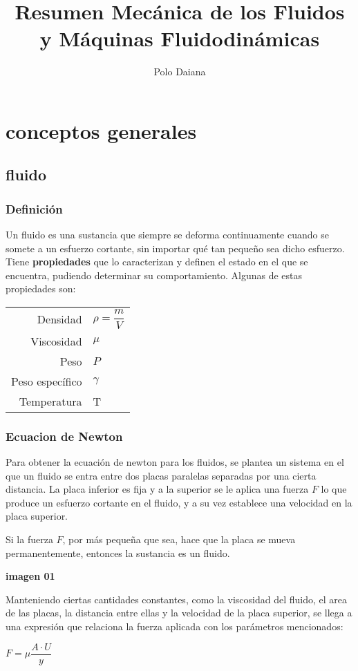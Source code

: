 \documentclass[11pt,a4paper]{article}
\title{Resumen Mecánica de los Fluidos y  Máquinas Fluidodinámicas}
\author{Polo Daiana}
\begin{document}
	\section{conceptos generales}
	\subsection{fluido}
	\subsubsection{Definición}
	Un fluido es una sustancia que siempre se deforma continuamente cuando se somete a un esfuerzo cortante, sin importar qué tan pequeño sea dicho esfuerzo.\\
	
	Tiene \textbf{propiedades} que lo caracterizan y definen el estado en el que se encuentra, pudiendo determinar su comportamiento. Algunas de estas propiedades son: \\
	\begin{center}
		\begin{tabular} {r l}
			Densidad & $\rho = \dfrac{m}{V}$\\
			Viscosidad & $\mu$\\
			Peso & $P$\\
			Peso específico & $\gamma$ \\
			Temperatura & T \\
		\end{tabular}
	\end{center}
	
	
	\subsubsection{Ecuacion de Newton}
	Para obtener la ecuación de newton para los fluidos, se plantea un sistema en el que un fluido se entra entre dos placas paralelas separadas por una cierta distancia. La placa inferior es fija y a la superior se le aplica una fuerza $F$ lo que produce un esfuerzo cortante en el fluido, y a su vez establece una velocidad en la placa superior.
	
	Si la fuerza $F$, por más pequeña que sea, hace que la placa se mueva permanentemente, entonces la sustancia es un fluido.
	
	\begin{center}
		\textbf{imagen 01}
	\end{center}
	
	Manteniendo ciertas cantidades constantes, como la viscosidad del fluido, el area de las placas, la distancia entre ellas y la velocidad de la placa superior, se llega a una expresión que relaciona la fuerza aplicada con los parámetros mencionados:
	\begin{center}
		$F = \mu \dfrac{A \cdot U}{y}$
	\end{center}
	
\end{document}
